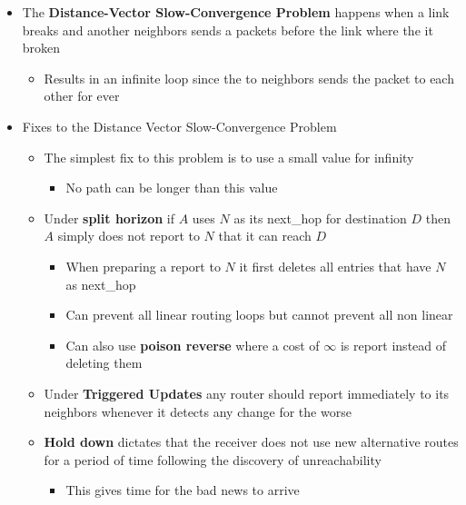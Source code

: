 \documentclass[11pt]{article}
\providecommand{\tightlist}{%
      \setlength{\itemsep}{0pt}\setlength{\parskip}{0pt}}
\begin{document}
\begin{itemize}
\tightlist
\item
  The \textbf{Distance-Vector Slow-Convergence Problem} happens when a
  link breaks and another neighbors sends a packets before the link
  where the it broken

  \begin{itemize}
  \tightlist
  \item
    Results in an infinite loop since the to neighbors sends the packet
    to each other for ever
  \end{itemize}
\item
  Fixes to the Distance Vector Slow-Convergence Problem

  \begin{itemize}
  \tightlist
  \item
    The simplest fix to this problem is to use a small value for
    infinity

    \begin{itemize}
    \tightlist
    \item
      No path can be longer than this value
    \end{itemize}
  \item
    Under \textbf{split horizon} if \(A\) uses \(N\) as its next\_hop
    for destination \(D\) then \(A\) simply does not report to \(N\)
    that it can reach \(D\)

    \begin{itemize}
    \tightlist
    \item
      When preparing a report to \(N\) it first deletes all entries that
      have \(N\) as next\_hop
    \item
      Can prevent all linear routing loops but cannot prevent all non
      linear
    \item
      Can also use \textbf{poison reverse} where a cost of \(\infty\) is
      report instead of deleting them
    \end{itemize}
  \item
    Under \textbf{Triggered Updates} any router should report
    immediately to its neighbors whenever it detects any change for the
    worse
  \item
    \textbf{Hold down} dictates that the receiver does not use new
    alternative routes for a period of time following the discovery of
    unreachability

    \begin{itemize}
    \tightlist
    \item
      This gives time for the bad news to arrive
    \end{itemize}
  \end{itemize}
\end{itemize}
\end{document}
